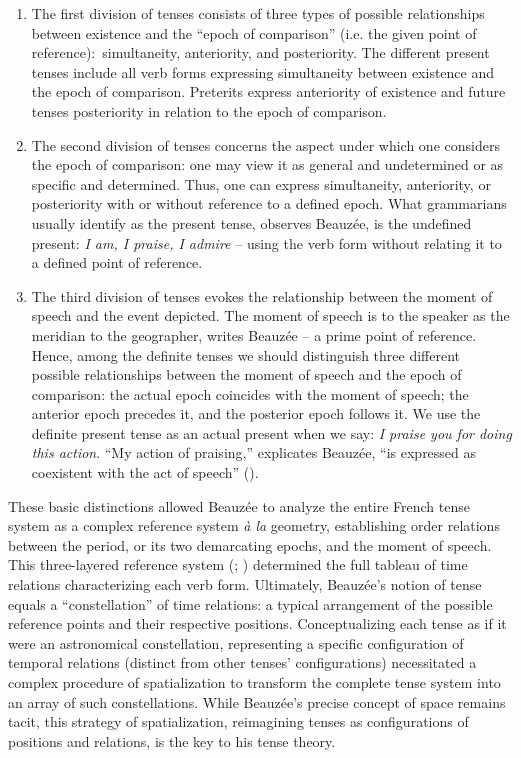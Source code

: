 \documentclass[english,output=paper,colorlinks,citecolor=brown]{../langscibook}
\begin{document}
 \begin{enumerate}
 \item The first division of tenses consists of three types of possible relationships between existence and the “epoch of comparison” (i.e. the given point of reference):~simultaneity, anteriority, and posteriority. The different present tenses include all verb forms expressing simultaneity between existence and the epoch of comparison. Preterits express anteriority of existence and future tenses posteriority in relation to the epoch of comparison.
 
 \item The second division of tenses concerns the aspect under which one considers the epoch of comparison: one may view it as general and undetermined or as specific and determined. Thus, one can express simultaneity, anteriority, or posteriority with or without reference to a defined epoch. What grammarians usually identify as the present tense, observes Beauzée, is the undefined present: \textit{I am, I praise, I admire} -- using the verb form without relating it to a defined point of reference.
 
 \item The third division of tenses evokes the relationship between the moment of speech and the event depicted. The moment of speech is to the speaker as the meridian to the geographer, writes Beauzée -- a prime point of reference. Hence, among the definite tenses we should distinguish three different possible relationships between the moment of speech and the epoch of comparison: the actual epoch coincides with the moment of speech; the anterior epoch precedes it, and the posterior epoch follows it. We use the definite present tense as an actual present when we say: \textit{I praise you for doing this action}. “My action of praising,” explicates Beauzée, “is expressed as coexistent with the act of speech” (\citealt[98]{Beauzée1765}).
\end{enumerate}
 
These basic distinctions allowed Beauzée to analyze the entire French tense system as a complex reference system \textit{à la} geometry, establishing order relations between the period, or its two demarcating epochs, and the moment of speech. This three-layered reference system (\citealt{Auroux1991}; \citealt{Fournier2013}) determined the full tableau of time relations characterizing each verb form. Ultimately, Beauzée’s notion of tense equals a “constellation” of time relations: a typical arrangement of the possible reference points and their respective positions. Conceptualizing each tense as if it were an astronomical constellation, representing a specific configuration of temporal relations (distinct from other tenses’ configurations) necessitated a complex procedure of spatialization to transform the complete tense system into an array of such constellations. While Beauzée’s precise concept of space remains tacit, this strategy of spatialization, reimagining tenses as configurations of positions and relations, is the key to his tense theory.
\end{document}
